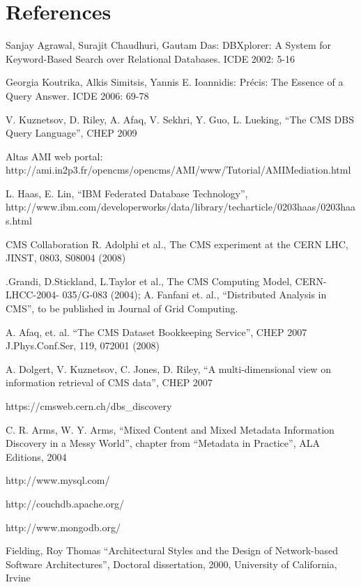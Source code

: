 \documentclass[a4paper]{jpconf}
\begin{document}
\section*{References}
\begin{thebibliography}{9}
Sanjay Agrawal, Surajit Chaudhuri, Gautam Das: DBXplorer: A System for
Keyword-Based Search over Relational Databases. ICDE 2002: 5-16

Georgia Koutrika, Alkis Simitsis, Yannis E. Ioannidis: Pr\'{e}cis: The Essence of
a Query Answer. ICDE 2006: 69-78

 V. Kuznetsov, D. Riley, A. Afaq, V. Sekhri, Y. Guo, L. Lueking,
``The CMS DBS Query Language'', CHEP 2009

Altas AMI web portal:
http://ami.in2p3.fr/opencms/opencms/AMI/www/Tutorial/AMIMediation.html

L. Haas, E. Lin,
``IBM Federated Database Technology'', \\
http://www.ibm.com/developerworks/data/library/techarticle/0203haas/0203haas.html

 CMS Collaboration R. Adolphi et al., The CMS experiment at the CERN LHC, JINST, 0803, S08004 (2008)

.Grandi, D.Stickland, L.Taylor et al., The CMS Computing Model, CERN-LHCC-2004- 035/G-083 (2004);
A. Fanfani et. al.,
``Distributed Analysis in CMS'', to be published in Journal of Grid Computing.

 A. Afaq, et. al. ``The CMS Dataset Bookkeeping Service'', CHEP 2007 
J.Phys.Conf.Ser, 119, 072001 (2008)

 A. Dolgert, V. Kuznetsov, C. Jones, D. Riley, 
``A multi-dimensional view on information retrieval of CMS data'', CHEP 2007

 https://cmsweb.cern.ch/dbs\_discovery

C. R. Arms, W. Y. Arms, ``Mixed Content and Mixed Metadata 
Information Discovery in a Messy World'',
chapter from ``Metadata in Practice'', ALA Editions, 2004

http://www.mysql.com/

http://couchdb.apache.org/

http://www.mongodb.org/

Fielding, Roy Thomas ``Architectural Styles and the Design of 
Network-based Software Architectures'', Doctoral dissertation, 2000,
University of California, Irvine


\end{thebibliography}
\end{document}
